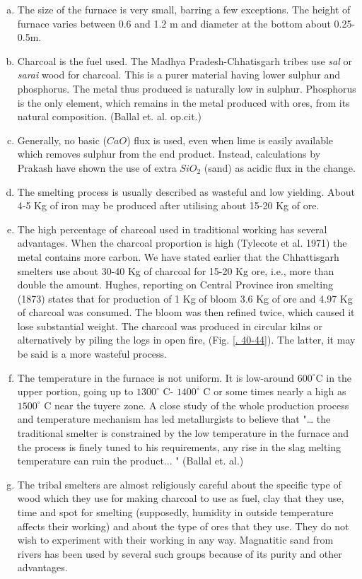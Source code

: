 \begin{enumerate}[a)]
\item The size of the furnace is very small, barring a few exceptions. The height of furnace varies between 0.6 and 1.2 m and diameter at the bottom about 0.25-0.5m.
\item Charcoal is the fuel used. The Madhya Pradesh-Chhatisgarh tribes use {\it sal} or {\it sarai} wood for charcoal. This is a purer material having lower sulphur and phosphorus. The metal thus produced is naturally low in sulphur. Phosphorus is the only element, which remains in the metal produced with ores, from its natural composition. (Ballal et. al. op.cit.)  	
\item Generally, no basic ($CaO$) flux is used, even when lime is easily available which removes sulphur from the end product. Instead, calculations by Prakash have shown the use of extra $SiO_2$ (sand) as acidic flux in the change.
\item The smelting process is usually described as wasteful and low yielding. About 4-5 Kg of iron may be produced after utilising about 15-20 Kg of ore.
\item The high percentage of charcoal used in traditional working has several advantages. When the charcoal proportion is high (Tylecote et al. 1971) the metal contains more carbon. We have stated earlier that the Chhattisgarh smelters use about 30-40 Kg of charcoal for 15-20 Kg ore, i.e., more than double the amount. Hughes, reporting on Central Province iron smelting (1873) states that for production of 1 Kg of bloom 3.6 Kg of ore and 4.97 Kg of charcoal was consumed. The bloom was then refined twice, which caused it lose substantial weight. The charcoal was produced in circular kilns or alternatively by piling the logs in open fire, (Fig. \ref{. 40-44}). The latter, it may be said is a more wasteful process.
\item The temperature in the furnace is not uniform. It is low-around $600^\circ$C in the upper portion, going up to $1300^\circ$ C- $1400^\circ$ C or some times nearly a high as $1500^\circ$ C near the tuyere zone. A close study of the whole production process and temperature mechanism has led metallurgists to believe that "… the traditional smelter is constrained by the low temperature in the furnace and the process is finely tuned to his requirements, any rise in the slag melting temperature can ruin the product... " (Ballal et. al.) 
\item The tribal smelters are almost religiously careful about the specific type of wood which they use for making charcoal to use as fuel, clay that they use, time and spot for smelting (supposedly, humidity in outside temperature affects their working) and about the type of ores that they use. They do not wish to experiment with their working in any way. Magnatitic sand from rivers has been used by several such groups because of its purity and other advantages.

\end{enumerate}
